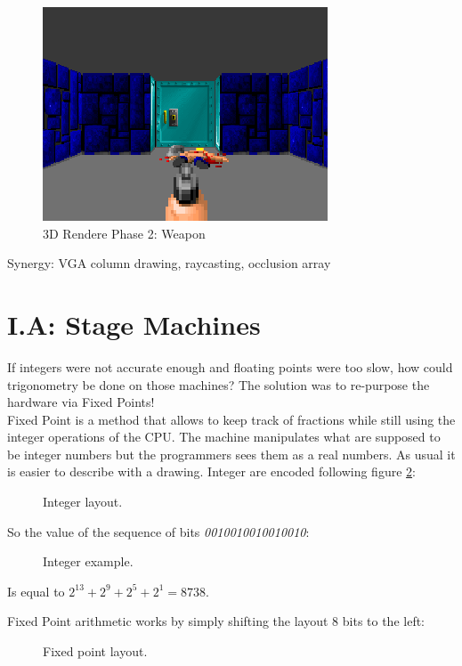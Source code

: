 \documentclass[book.tex]{subfiles}
\begin{document}
 \begin{figure}[H]
\centering
 \includegraphics[scale=1.3]{screenshots/wolf3d_7_fullframe.png}
 \caption{3D Rendere Phase 2: Weapon} \label{fig:mips}
 \end{figure}
 

   Synergy: VGA column drawing, raycasting, occlusion array

\section{I.A: Stage Machines}
 
If integers were not accurate enough and floating points were too slow, how could trigonometry be done on those machines? The solution was to re-purpose the hardware via Fixed Points!\\
Fixed Point is a method that allows to keep track of fractions while still using the integer operations of the CPU. The machine manipulates what are supposed to be integer numbers but the programmers sees them as a real numbers. As usual it is easier to describe with a drawing. Integer are encoded following figure \ref{fig:int_layout}:
\begin{figure}[H]
\centering
 
 \caption{Integer layout.} \label{fig:int_layout}
 \end{figure}

So the value of the sequence of bits \emph{0010010010010010}:
\begin{figure}[H]
\centering

 \caption{Integer example.} \label{fig:mips}
 \end{figure}

 Is equal to $ 2^{13} + 2^9 + 2^5 + 2^1 =  8738 $.

\bigskip


Fixed Point arithmetic works by simply shifting the layout 8 bits to the left:
\begin{figure}[H]
 \centering
  
 \caption{Fixed point layout.} \label{fig:mips}
\end{figure}
\end{document}
